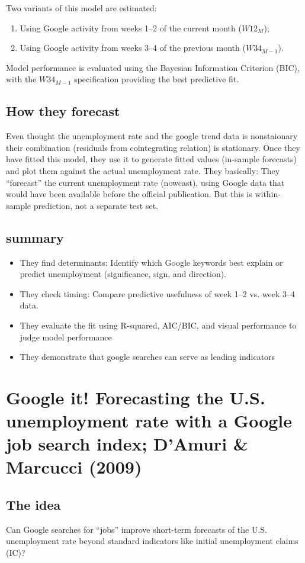 \documentclass{article}
\begin{document}
Two variants of this model are estimated:
\begin{enumerate}
    \item Using Google activity from weeks 1--2 of the current month ($W12_M$);
    \item Using Google activity from weeks 3--4 of the previous month ($W34_{M-1}$).
\end{enumerate}
Model performance is evaluated using the Bayesian Information Criterion (BIC),
with the $W34_{M-1}$ specification providing the best predictive fit.


\subsection{How they forecast}
Even thought the unemployment rate and the google trend data is nonstaionary their combination (residuals from cointegrating relation) is stationary.
Once they have fitted this model, they use it to generate fitted values (in-sample forecasts) and plot them against the actual unemployment rate.
They basically: They “forecast” the current unemployment rate (nowcast), using Google data that would have been available before the official publication. But this is within-sample prediction, not a separate test set.


\subsection{summary}
\begin{itemize}
    \item They find determinants: Identify which Google keywords best explain or predict unemployment (significance, sign, and direction).
    \item They check timing: Compare predictive usefulness of week 1–2 vs. week 3–4 data.
    \item They evaluate the fit using R-squared, AIC/BIC, and visual performance to judge model performance
    \item They demonstrate that google searches can serve as leading indicators
\end{itemize}

\newpage
\section{Google it! Forecasting the U.S. unemployment rate with a Google job search index; D’Amuri \& Marcucci (2009)}

\subsection{The idea}
Can Google searches for “jobs” improve short-term forecasts of the U.S. unemployment rate beyond standard indicators like initial unemployment claims (IC)?
\end{document}
